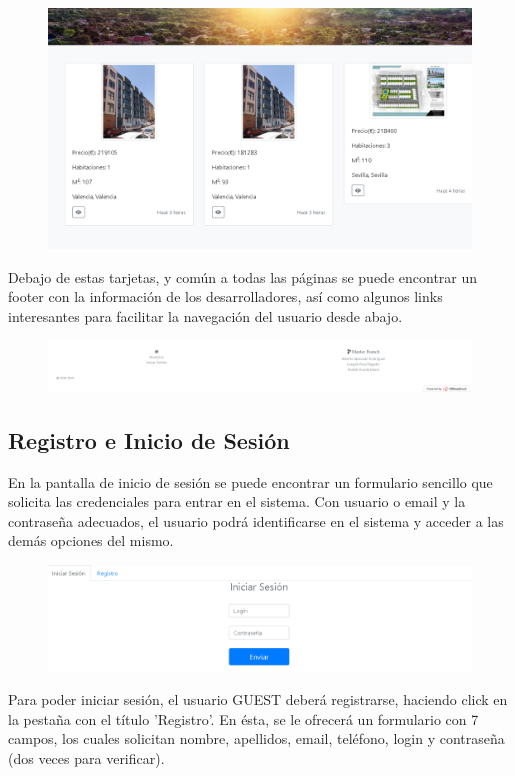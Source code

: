 \begin{figure}[h!]
\centering
\includegraphics[width=.5\textwidth]{Img/ManualUsuario/TARJETAS.png}
\end{figure}


Debajo de estas tarjetas, y com\'{u}n a todas las p\'{a}ginas se puede encontrar un footer con la informaci\'{o}n de los desarrolladores, as\'{i} como algunos links interesantes para facilitar la navegaci\'{o}n del usuario desde abajo.

\begin{figure}[h!]
\centering
\includegraphics[width=1\textwidth]{Img/ManualUsuario/FOOTER.png}
\end{figure}

\subsection{Registro e Inicio de Sesi\'{o}n}
En la pantalla de inicio de sesi\'{o}n se puede encontrar un formulario sencillo que solicita las credenciales para entrar en el sistema. Con usuario o email y la contrase\~{n}a adecuados, el usuario podr\'{a} identificarse en el sistema y acceder a las dem\'{a}s opciones del mismo.


\begin{figure}[h!]
\centering
\includegraphics[width=.7\textwidth]{Img/ManualUsuario/LOGIN.png}
\end{figure}


Para poder iniciar sesi\'{o}n, el usuario GUEST deber\'{a} registrarse, haciendo click en la pesta\~{n}a con el t\'{i}tulo 'Registro'. En \'{e}sta, se le ofrecer\'{a} un formulario con 7 campos, los cuales solicitan nombre, apellidos, email, tel\'{e}fono, login y contrase\~{n}a (dos veces para verificar).

